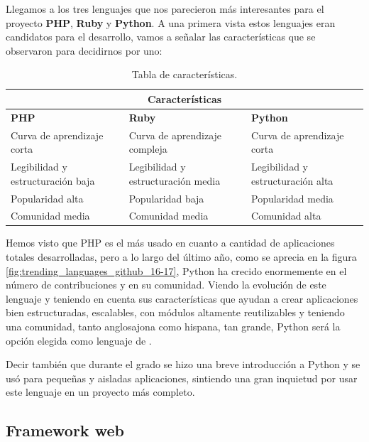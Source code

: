 \bigskip
Llegamos a los tres lenguajes que nos parecieron más interesantes para el proyecto \textbf{PHP}, \textbf{Ruby} y \textbf{Python}\cite{python_blackbook}. A una primera vista estos lenguajes eran candidatos para el desarrollo, vamos a señalar las características que se observaron para decidirnos por uno:


\bigskip
\begin{table}[htb]
\begin{tabular}{| p{4.2cm}| p{4.2cm} | p{4.2cm} |}
\hline
\multicolumn{3}{|c|}{\textbf{Características}} \\
\hline
\textbf{PHP} & \textbf{Ruby} & \textbf{Python} \\
\hline \hline \hline

Curva de aprendizaje corta & Curva de aprendizaje compleja & Curva de aprendizaje corta\\ \hline
Legibilidad y estructuración baja & Legibilidad y estructuración media & Legibilidad y estructuración alta \\ \hline
Popularidad alta & Popularidad baja & Popularidad media \\ \hline
Comunidad media & Comunidad media & Comunidad alta \\ \hline
\end{tabular}
\caption{Tabla de características.}
\label{tabla:anchofijo}
\end{table}

\bigskip
Hemos visto que PHP es el más usado en cuanto a cantidad de aplicaciones totales desarrolladas, pero a lo largo del último año, como se aprecia en la figura \ref{fig:trending_languages_github_16-17}, Python ha crecido enormemente en el número de contribuciones y en su comunidad. Viendo la evolución de este lenguaje y teniendo en cuenta sus características que ayudan a crear aplicaciones bien estructuradas, escalables, con módulos altamente reutilizables y teniendo una comunidad, tanto anglosajona como hispana, tan grande, Python será la opción elegida como lenguaje de \titulo .

\bigskip
Decir también que durante el grado se hizo una breve introducción a Python y se usó para pequeñas y aisladas aplicaciones, sintiendo una gran inquietud por usar este lenguaje en un proyecto más completo.




\subsection{Framework web}

